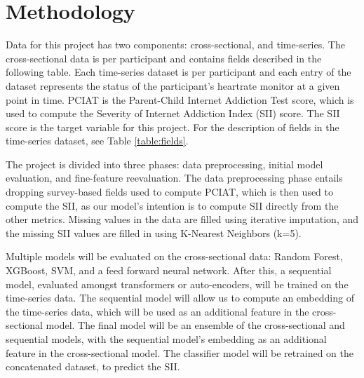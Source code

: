 \documentclass[11pt]{extarticle}
\newcommand{\todo}{\textcolor{red}{TODO:}~}
\begin{document}
\section{Methodology} 

Data for this project has two components: cross-sectional, and time-series. The cross-sectional data is per participant and contains fields described in the following table.
Each time-series dataset is per participant and each entry of the dataset represents the status of the participant's heartrate monitor at a given point in time. PCIAT is the Parent-Child Internet Addiction Test score, which is used to compute the Severity of Internet Addiction Index (SII) score. The SII score is the target variable for this project. For the description of fields in the time-series dataset, see Table \ref{table:fields}.

The project is divided into three phases: data preprocessing, initial model evaluation, and fine-feature reevaluation.
The data preprocessing phase entails dropping survey-based fields used to compute PCIAT, which is then used to compute the SII, as our model's intention is to compute SII directly from the other metrics.
Missing values in the data are filled using iterative imputation, and the missing SII values are filled in using K-Nearest Neighbors (k=5).

Multiple models will be evaluated on the cross-sectional data: Random Forest, XGBoost, SVM, and a feed forward neural network. After this, a sequential model, evaluated amongst transformers or auto-encoders, will be trained on the time-series data. The sequential model will allow us to compute an embedding of the time-series data, which will be used as an additional feature in the cross-sectional model.
The final model will be an ensemble of the cross-sectional and sequential models, with the sequential model's embedding as an additional feature in the cross-sectional model. The classifier model will be retrained on the concatenated dataset, to predict the SII.
\end{document}
